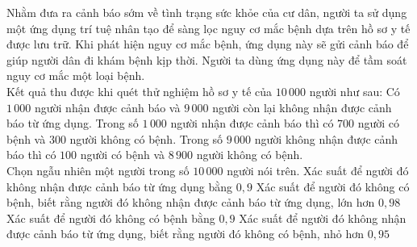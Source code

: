 \begin{ex}%
	Nhằm đưa ra cảnh báo sớm về tình trạng sức khỏe của cư dân, người ta sử dụng một ứng dụng trí tuệ nhân tạo để sàng lọc nguy cơ mắc bệnh dựa trên hồ sơ y tế được lưu trữ. Khi phát hiện nguy cơ mắc bệnh, ứng dụng này sẽ gửi cảnh báo để giúp người dân đi khám bệnh kịp thời. Người ta dùng ứng dụng này để tầm soát nguy cơ mắc một loại bệnh.\\
	Kết quả thu được khi quét thử nghiệm hồ sơ y tế của $10\,000$ người như sau: Có $1\,000$ người nhận được cảnh báo và $9\,000$ người còn lại không nhận được cảnh báo từ ứng dụng. Trong số $1\,000$ người nhận được cảnh báo thì có $700$ người có bệnh và $300$ người không có bệnh. Trong số $9\,000$ người không nhận được cảnh báo thì có $100$ người có bệnh và $8\,900$ người không có bệnh.\\
	Chọn ngẫu nhiên một người trong số $10\,000$ người nói trên.
	\choiceTF
		{\True Xác suất để người đó không nhận được cảnh báo từ ứng dụng bằng $0{,}9$}
		{\True Xác suất để người đó không có bệnh, biết rằng người đó không nhận được cảnh báo từ ứng dụng, lớn hơn $0{,}98$}
		{Xác suất để người đó không có bệnh bằng $0{,}9$}
		{Xác suất để người đó không nhận được cảnh báo từ ứng dụng, biết rằng người đó không có bệnh, nhỏ hơn $0{,}95$}
\end{ex}
